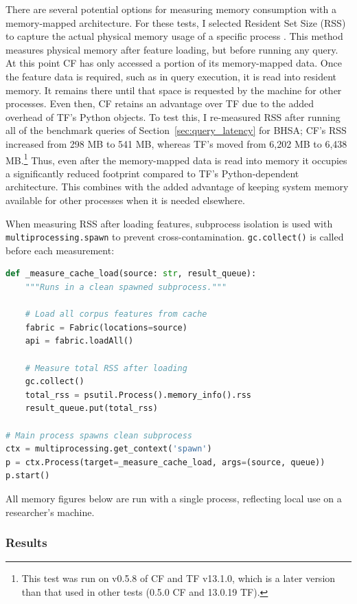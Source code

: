 \documentclass[11pt,a4paper]{article}
\begin{document}
There are several potential options for measuring memory consumption \cite{beyer2019reliable} with a memory-mapped
architecture. For these tests, I selected Resident Set Size (RSS) to capture the actual physical memory usage of a
specific process \cite{psutil}. This method measures physical memory after feature loading, but before running any query.
At this point CF has only accessed a portion of its memory-mapped data. Once the feature data is required, such as in query execution,
it is read into resident memory. It remains there until that space is requested by the machine for other processes.
Even then, CF retains an advantage over TF due to the added overhead of TF's Python objects. To test this, I re-measured RSS after
running all of the benchmark queries of Section~\ref{sec:query_latency} for BHSA; CF's RSS increased from 298 MB to 541 MB, whereas TF's
moved from 6,202 MB to 6,438 MB.\footnote{
    This test was run on v0.5.8 of CF and TF v13.1.0, which is a later version than that
    used in other tests (0.5.0 CF and 13.0.19 TF).
}
Thus, even after the memory-mapped data is read into memory it occupies a significantly reduced
footprint compared to TF's Python-dependent architecture. This combines with the added advantage of keeping system memory
available for other processes when it is needed elsewhere.

When measuring RSS after loading features, subprocess isolation is used with \texttt{multiprocessing.spawn} to prevent
cross-contamination. \texttt{gc.collect()} is called before each measurement:

\begin{lstlisting}[language=Python, caption=Subprocess isolation pattern]
def _measure_cache_load(source: str, result_queue):
    """Runs in a clean spawned subprocess."""

    # Load all corpus features from cache
    fabric = Fabric(locations=source)
    api = fabric.loadAll()

    # Measure total RSS after loading
    gc.collect()
    total_rss = psutil.Process().memory_info().rss
    result_queue.put(total_rss)

# Main process spawns clean subprocess
ctx = multiprocessing.get_context('spawn')
p = ctx.Process(target=_measure_cache_load, args=(source, queue))
p.start()
\end{lstlisting}

All memory figures below are run with a single process, reflecting local use on a researcher's machine.

\subsubsection{Results}
\end{document}
